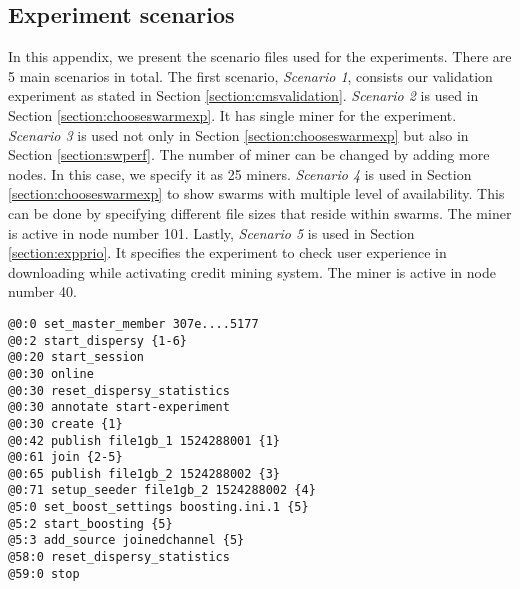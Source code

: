 \begin{appendices}
\chapter{Experiment scenarios}
\label{app:expscenario}

In this appendix, we present the scenario files used for the experiments. There are 5 main scenarios in total. The first scenario, \textit{Scenario 1}, consists our validation experiment as stated in Section \ref{section:cmsvalidation}. \textit{Scenario 2} is used in Section \ref{section:chooseswarmexp}. It has single miner for the experiment. \textit{Scenario 3} is used not only in Section \ref{section:chooseswarmexp} but also in Section \ref{section:swperf}. The number of miner can be changed by adding more nodes. In this case, we specify it as 25 miners. \textit{Scenario 4} is used in Section \ref{section:chooseswarmexp} to show swarms with multiple level of availability. This can be done by specifying different file sizes that reside within swarms. The miner is active in node number 101.  Lastly, \textit{Scenario 5} is used in Section \ref{section:expprio}. It specifies the experiment to check user experience in downloading while activating credit mining system. The miner is active in node number 40. 

\begin{lstlisting}[caption={Scenario 1.}]
@0:0 set_master_member 307e....5177
@0:2 start_dispersy {1-6}
@0:20 start_session
@0:30 online
@0:30 reset_dispersy_statistics
@0:30 annotate start-experiment
@0:30 create {1}
@0:42 publish file1gb_1 1524288001 {1}
@0:61 join {2-5}
@0:65 publish file1gb_2 1524288002 {3}
@0:71 setup_seeder file1gb_2 1524288002 {4}
@5:0 set_boost_settings boosting.ini.1 {5}
@5:2 start_boosting {5}
@5:3 add_source joinedchannel {5}
@58:0 reset_dispersy_statistics
@59:0 stop
\end{lstlisting}


\end{appendices}
